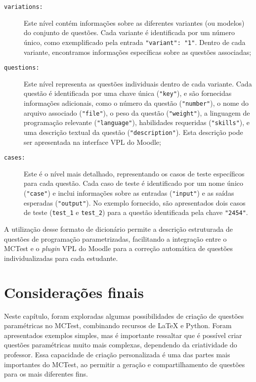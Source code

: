 \begin{description}
\item[\texttt{variations:}]  Este nível contém informações sobre as diferentes variantes (ou modelos) do conjunto de questões. Cada variante é identificada por um número único, como exemplificado pela entrada \verb|"variant": "1"|. Dentro de cada variante, encontramos informações específicas sobre as questões associadas;

\item[\texttt{questions:}] Este nível representa as questões individuais dentro de cada variante. Cada questão é identificada por uma chave única (\verb|"key"|), e são fornecidas informações adicionais, como o número da questão (\verb|"number"|), o nome do arquivo associado (\verb|"file"|), o peso da questão (\verb|"weight"|), a linguagem de programação relevante (\verb|"language"|), habilidades requeridas (\verb|"skills"|), e uma descrição textual da questão (\verb|"description"|). Esta descrição pode ser apresentada na interface VPL do Moodle;

\item[\texttt{cases:}] Este é o nível mais detalhado, representando os casos de teste específicos para cada questão. Cada caso de teste é identificado por um nome único (\verb|"case"|) e inclui informações sobre as entradas (\verb|"input"|) e as saídas esperadas (\verb|"output"|). No exemplo fornecido, são apresentados dois casos de teste (\verb|test_1| e \verb|test_2|) para a questão identificada pela chave \verb|"2454"|.
\end{description}

A utilização desse formato de dicionário permite a descrição estruturada de questões de programação parametrizadas, facilitando a integração entre o MCTest e o \textit{plugin} VPL do Moodle para a correção automática de questões individualizadas para cada estudante.

\section{Considerações finais}

Neste capítulo, foram exploradas algumas possibilidades de criação de questões paramétricas no MCTest, combinando recursos de \LaTeX{} e Python. Foram apresentados exemplos simples, mas é importante ressaltar que é possível criar questões paramétricas muito mais complexas, dependendo da criatividade do professor. Essa capacidade de criação personalizada é uma das partes mais importantes do MCTest, ao permitir a geração e compartilhamento de questões para os mais diferentes fins.

